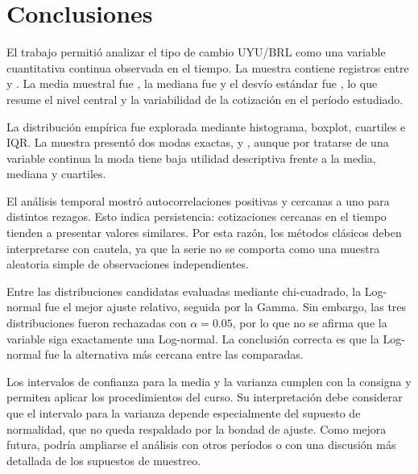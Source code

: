 \section{Conclusiones}

El trabajo permitió analizar el tipo de cambio UYU/BRL como una variable cuantitativa continua observada en el tiempo. La muestra contiene \TotalRegistros{} registros entre \FechaMinima{} y \FechaMaxima{}. La media muestral fue \MediaCambio{}, la mediana fue \MedianaCambio{} y el desvío estándar fue \DesvioCambio{}, lo que resume el nivel central y la variabilidad de la cotización en el período estudiado.

La distribución empírica fue explorada mediante histograma, boxplot, cuartiles e IQR. La muestra presentó dos modas exactas, \ModaCambioUno{} y \ModaCambioDos{}, aunque por tratarse de una variable continua la moda tiene baja utilidad descriptiva frente a la media, mediana y cuartiles.

El análisis temporal mostró autocorrelaciones positivas y cercanas a uno para distintos rezagos. Esto indica persistencia: cotizaciones cercanas en el tiempo tienden a presentar valores similares. Por esta razón, los métodos clásicos deben interpretarse con cautela, ya que la serie no se comporta como una muestra aleatoria simple de observaciones independientes.

Entre las distribuciones candidatas evaluadas mediante chi-cuadrado, la Log-normal fue el mejor ajuste relativo, seguida por la Gamma. Sin embargo, las tres distribuciones fueron rechazadas con \(\alpha=0.05\), por lo que no se afirma que la variable siga exactamente una Log-normal. La conclusión correcta es que la Log-normal fue la alternativa más cercana entre las comparadas.

Los intervalos de confianza para la media y la varianza cumplen con la consigna y permiten aplicar los procedimientos del curso. Su interpretación debe considerar que el intervalo para la varianza depende especialmente del supuesto de normalidad, que no queda respaldado por la bondad de ajuste. Como mejora futura, podría ampliarse el análisis con otros períodos o con una discusión más detallada de los supuestos de muestreo.

